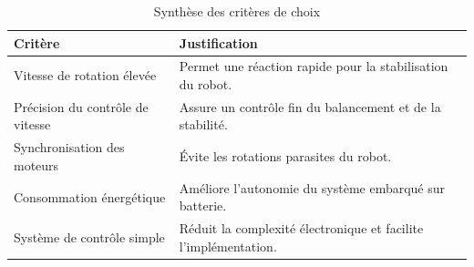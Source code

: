 \begin{table}[h]
    \centering
    \caption{Synthèse des critères de choix}
    \label{tab:criteres_moteurs}
    \begin{tabular}{|l|p{10cm}|}
        \hline
        \textbf{Critère} & \textbf{Justification} \\
        \hline
        Vitesse de rotation élevée & Permet une réaction rapide pour la stabilisation du robot. \\
        \hline
        Précision du contrôle de vitesse & Assure un contrôle fin du balancement et de la stabilité. \\
        \hline
        Synchronisation des moteurs & Évite les rotations parasites du robot. \\
        \hline
        Consommation énergétique & Améliore l’autonomie du système embarqué sur batterie. \\
        \hline
        Système de contrôle simple & Réduit la complexité électronique et facilite l’implémentation. \\
        \hline
    \end{tabular}
\end{table}